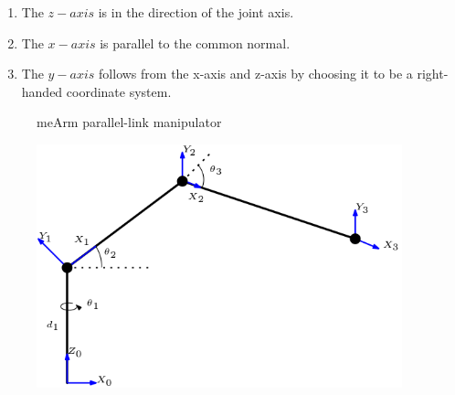 \documentclass[
  letterpaper,
  DIV=11,
  numbers=noendperiod]{scrreprt}
\providecommand{\tightlist}{%
  \setlength{\itemsep}{0pt}\setlength{\parskip}{0pt}}\usepackage{longtable,booktabs,array}
\begin{document}
\begin{enumerate}
\def\labelenumi{\arabic{enumi}.}
\tightlist
\item
  The \(z-axis\) is in the direction of the joint axis.
\item
  The \(x-axis\) is parallel to the common normal.
\item
  The \(y-axis\) follows from the x-axis and z-axis by choosing it to be
  a right-handed coordinate system.
\end{enumerate}

\begin{figure}

\begin{minipage}[t]{0.50\linewidth}

{\centering 


\caption{meArm parallel-link manipulator}

}

\end{minipage}%

\caption{\label{fig-dh}\includegraphics[width=4.16667in,height=\textheight]{./images/meArm.png}}

\end{figure}
\end{document}
